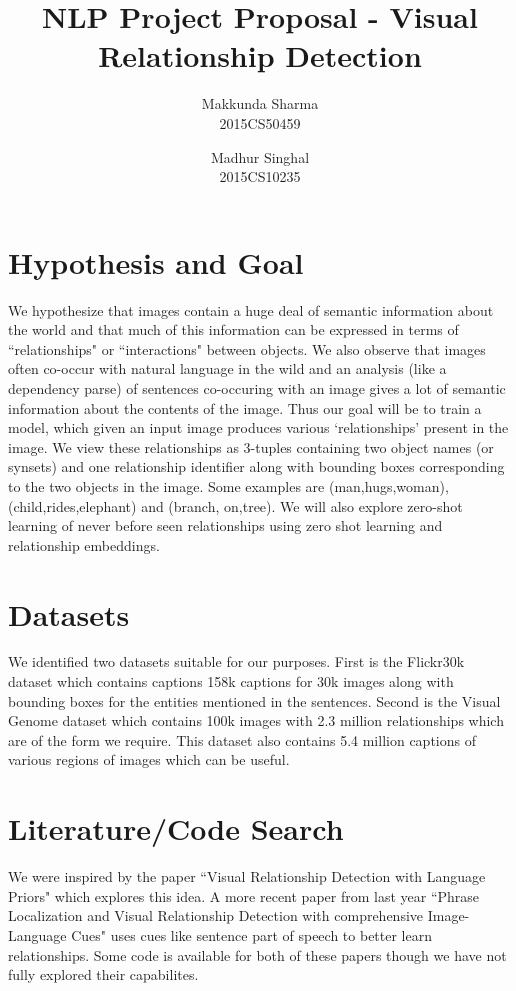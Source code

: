 \documentclass[10pt,a4paper]{article}
\title{NLP Project Proposal - Visual Relationship Detection}
\author{Makkunda Sharma \\ 2015CS50459 \and Madhur Singhal \\ 2015CS10235}
\begin{document}
\maketitle
\section{Hypothesis and Goal}
We hypothesize that images contain a huge deal of semantic information about the world and that much of this information can be expressed in terms of ``relationships" or ``interactions" between objects. We also observe that images often co-occur with natural language in the wild and an analysis (like a dependency parse) of sentences co-occuring with an image gives a lot of semantic information about the contents of the image. Thus our goal will be to train a model, which given an input image produces various `relationships' present in the image. We view these relationships as 3-tuples containing two object names (or synsets) and one relationship identifier along with bounding boxes corresponding to the two objects in the image. Some examples are (man,hugs,woman), (child,rides,elephant)  and (branch, on,tree). We will also explore zero-shot learning of never before seen relationships using zero shot learning and relationship embeddings.

\section{Datasets}
We identified two datasets suitable for our purposes. First is the Flickr30k dataset which contains captions 158k captions for 30k images along with bounding boxes for the entities mentioned in the sentences. Second is the Visual Genome dataset which contains 100k images with 2.3 million relationships which are of the form we require. This dataset also contains 5.4 million captions of various regions of images which can be useful.

\section{Literature/Code Search}
We were inspired by the paper ``Visual Relationship Detection with Language Priors" which explores this idea. A more recent paper from last year ``Phrase Localization and Visual Relationship Detection with comprehensive Image-Language Cues" uses cues like sentence part of speech to better learn relationships. Some code is available for both of these papers though we have not fully explored their capabilites. 
\end{document}
